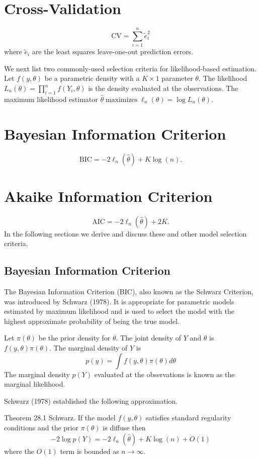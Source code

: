 \documentclass[10pt]{article}
\begin{document}
\section{Cross-Validation}
$$
\mathrm{CV}=\sum_{i=1}^{n} \widetilde{e}_{i}^{2}
$$
where $\widetilde{e}_{i}$ are the least squares leave-one-out prediction errors.

We next list two commonly-used selection criteria for likelihood-based estimation. Let $f(y, \theta)$ be a parametric density with a $K \times 1$ parameter $\theta$. The likelihood $L_{n}(\theta)=\prod_{i=1}^{n} f\left(Y_{i}, \theta\right)$ is the density evaluated at the observations. The maximum likelihood estimator $\widehat{\theta} \operatorname{maximizes} \ell_{n}(\theta)=\log L_{n}(\theta)$.

\section{Bayesian Information Criterion}
$$
\mathrm{BIC}=-2 \ell_{n}(\widehat{\theta})+K \log (n) .
$$

\section{Akaike Information Criterion}
$$
\mathrm{AIC}=-2 \ell_{n}(\widehat{\theta})+2 K .
$$
In the following sections we derive and discuss these and other model selection criteria.

\subsection{Bayesian Information Criterion}
The Bayesian Information Criterion (BIC), also known as the Schwarz Criterion, was introduced by Schwarz (1978). It is appropriate for parametric models estimated by maximum likelihood and is used to select the model with the highest approximate probability of being the true model.

Let $\pi(\theta)$ be the prior density for $\theta$. The joint density of $Y$ and $\theta$ is $f(y, \theta) \pi(\theta)$. The marginal density of $Y$ is
$$
p(y)=\int f(y, \theta) \pi(\theta) d \theta
$$
The marginal density $p(Y)$ evaluated at the observations is known as the marginal likelihood.

Schwarz (1978) established the following approximation.

Theorem 28.1 Schwarz. If the model $f(y, \theta)$ satisfies standard regularity conditions and the prior $\pi(\theta)$ is diffuse then
$$
-2 \log p(Y)=-2 \ell_{n}(\widehat{\theta})+K \log (n)+O(1)
$$
where the $O(1)$ term is bounded as $n \rightarrow \infty$.
\end{document}

